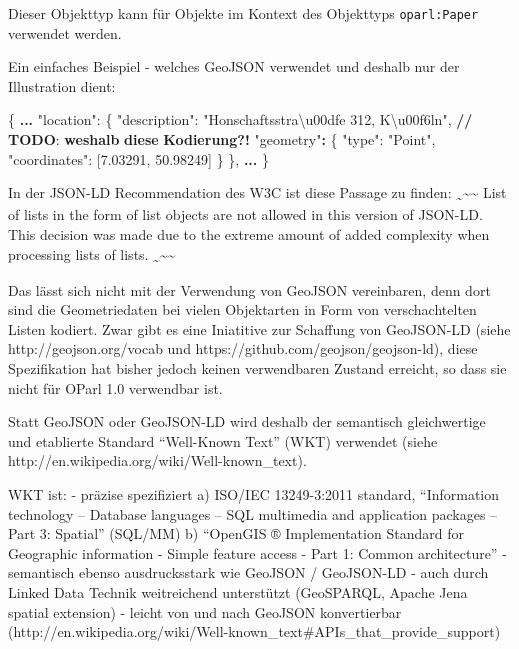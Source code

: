\documentclass[,a4paper]{article}
\newenvironment{Shaded}{}{}
\newcommand{\DataTypeTok}[1]{\textcolor[rgb]{0.56,0.13,0.00}{{#1}}}
\newcommand{\FloatTok}[1]{\textcolor[rgb]{0.25,0.63,0.44}{{#1}}}
\newcommand{\StringTok}[1]{\textcolor[rgb]{0.25,0.44,0.63}{{#1}}}
\newcommand{\ErrorTok}[1]{\textcolor[rgb]{1.00,0.00,0.00}{\textbf{{#1}}}}
\newcommand{\NormalTok}[1]{{#1}}
\begin{document}
Dieser Objekttyp kann für Objekte im Kontext des Objekttyps
\texttt{oparl:Paper} verwendet werden.

Ein einfaches Beispiel - welches GeoJSON verwendet und deshalb nur der
Illustration dient:

\begin{Shaded}
\begin{Highlighting}[]
\NormalTok{\{}
    \ErrorTok{...}
    \DataTypeTok{"location"}\NormalTok{: \{}
        \DataTypeTok{"description"}\NormalTok{: }\StringTok{"Honschaftsstra\textbackslash{}u00dfe 312, K\textbackslash{}u00f6ln"}\NormalTok{, }\ErrorTok{//} \ErrorTok{TODO}\NormalTok{: }\ErrorTok{weshalb} \ErrorTok{diese} \ErrorTok{Kodierung?!}
        \StringTok{"geometry"}\ErrorTok{:} \NormalTok{\{}
            \DataTypeTok{"type"}\NormalTok{: }\StringTok{"Point"}\NormalTok{,}
            \DataTypeTok{"coordinates"}\NormalTok{: [}\FloatTok{7.03291}\NormalTok{, }\FloatTok{50.98249}\NormalTok{]}
        \NormalTok{\}}
    \NormalTok{\},}
    \ErrorTok{...}
\NormalTok{\}}
\end{Highlighting}
\end{Shaded}

In der JSON-LD Recommendation des W3C ist diese Passage zu finden:
\textsubscript{\textasciitilde{}}\textasciitilde{}\textasciitilde{} List
of lists in the form of list objects are not allowed in this version of
JSON-LD. This decision was made due to the extreme amount of added
complexity when processing lists of lists.
\textsubscript{\textasciitilde{}}\textasciitilde{}\textasciitilde{}

Das lässt sich nicht mit der Verwendung von GeoJSON vereinbaren, denn
dort sind die Geometriedaten bei vielen Objektarten in Form von
verschachtelten Listen kodiert. Zwar gibt es eine Iniatitive zur
Schaffung von GeoJSON-LD (siehe http://geojson.org/vocab und
https://github.com/geojson/geojson-ld), diese Spezifikation hat bisher
jedoch keinen verwendbaren Zustand erreicht, so dass sie nicht für OParl
1.0 verwendbar ist.

Statt GeoJSON oder GeoJSON-LD wird deshalb der semantisch gleichwertige
und etablierte Standard ``Well-Known Text'' (WKT) verwendet (siehe
http://en.wikipedia.org/wiki/Well-known\_text).

WKT ist: - präzise spezifiziert a) ISO/IEC 13249-3:2011 standard,
``Information technology -- Database languages -- SQL multimedia and
application packages -- Part 3: Spatial'' (SQL/MM) b) ``OpenGIS ®
Implementation Standard for Geographic information - Simple feature
access - Part 1: Common architecture'' - semantisch ebenso
ausdrucksstark wie GeoJSON / GeoJSON-LD - auch durch Linked Data Technik
weitreichend unterstützt (GeoSPARQL, Apache Jena spatial extension) -
leicht von und nach GeoJSON konvertierbar
(http://en.wikipedia.org/wiki/Well-known\_text\#APIs\_that\_provide\_support)
\end{document}
